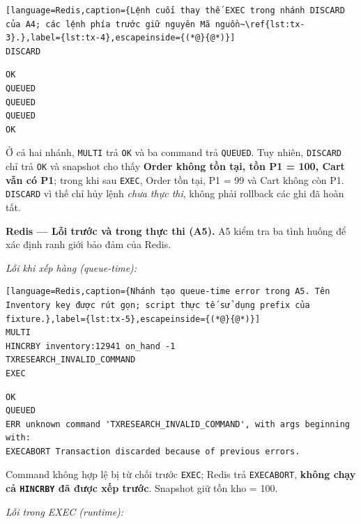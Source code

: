 \begin{lstlisting}[language=Redis,caption={Lệnh cuối thay thế EXEC trong nhánh DISCARD của A4; các lệnh phía trước giữ nguyên Mã nguồn~\ref{lst:tx-3}.},label={lst:tx-4},escapeinside={(*@}{@*)}]
DISCARD
\end{lstlisting}

\begingroup
{}\label{result:tx-3}
\nopagebreak[4]
\begin{Verbatim}
OK
QUEUED
QUEUED
QUEUED
OK
\end{Verbatim}
\endgroup\par\smallskip
Ở cả hai nhánh, \texttt{MULTI} trả \texttt{OK} và ba command trả \texttt{QUEUED}. Tuy nhiên, \texttt{DISCARD} chỉ trả \texttt{OK} và snapshot cho thấy \textbf{Order không tồn tại, tồn P1 = 100, Cart vẫn có P1}; trong khi sau \texttt{EXEC}, Order tồn tại, P1 = 99 và Cart không còn P1. \texttt{DISCARD} vì thế chỉ hủy lệnh \emph{chưa thực thi}, không phải rollback các ghi đã hoàn tất.

\textbf{Redis — Lỗi trước và trong thực thi (A5).} A5 kiểm tra ba tình huống để xác định ranh giới bảo đảm của Redis.

\emph{Lỗi khi xếp hàng (queue-time):}

\begin{lstlisting}[language=Redis,caption={Nhánh tạo queue-time error trong A5. Tên Inventory key được rút gọn; script thực tế sử dụng prefix của fixture.},label={lst:tx-5},escapeinside={(*@}{@*)}]
MULTI
HINCRBY inventory:12941 on_hand -1
TXRESEARCH_INVALID_COMMAND
EXEC
\end{lstlisting}

\begingroup
{}\label{result:tx-4}
\nopagebreak[4]
\begin{Verbatim}
OK
QUEUED
ERR unknown command 'TXRESEARCH_INVALID_COMMAND', with args beginning with:
EXECABORT Transaction discarded because of previous errors.
\end{Verbatim}
\endgroup\par\smallskip
Command không hợp lệ bị từ chối trước \texttt{EXEC}; Redis trả \texttt{EXECABORT}, \textbf{không chạy cả \texttt{HINCRBY} đã được xếp trước}. Snapshot giữ tồn kho = 100.

\emph{Lỗi trong EXEC (runtime):}

